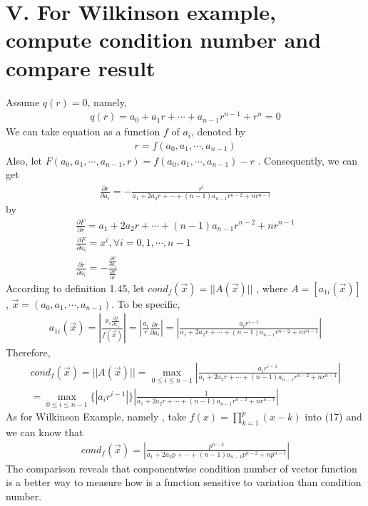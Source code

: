 \documentclass[twoside,a4paper]{article}
\begin{document}
\section*{V. For Wilkinson example, compute condition number and compare result}
Assume $q(r)=0$, namely,
\begin{gather}
q(r)=a_0+a_1r+\cdots+a_{n-1}r^{n-1}+r^n=0
\end{gather}
We can take equation as a function $f$ of $a_i$, denoted by
\begin{gather}
r=f(a_0,a_1,\cdots,a_{n-1})
\end{gather}
Also, let $F(a_0,a_1,\cdots,a_{n-1},r)=f(a_0,a_1,\cdots,a_{n-1})-r$ . Consequently, we can get
\begin{gather}
\frac{\partial r}{\partial a_i}=-\frac{r^i}{a_1+2a_2r+\cdots+(n-1)a_{n-1}r^{n-2}+nr^{n-1}}
\end{gather}
by
\begin{gather}
\frac{\partial{F}}{\partial{r}}=a_1+2a_2r+\cdots+(n-1)a_{n-1}r^{n-2}+nr^{n-1}\\
\frac{\partial{F}}{\partial{a_i}}=x^{i}, \forall i = 0,1,\cdots,n-1\\
\frac{\partial r}{\partial a_i}=-\frac{\frac{\partial{F}}{\partial{a_i}}}{\frac{\partial{F}}{\partial{r}}}
\end{gather}
According to definition 1.45, let $cond_f(\overrightarrow{x}) = ||A(\overrightarrow{x})||$ , where $A=[a_{1i}(\overrightarrow{x})]$ , $\overrightarrow{x}=(a_0,a_1,\cdots,a_{n-1})$. To be specific,
\begin{gather}
a_{1i}(\overrightarrow{x})=|\frac{x_i\frac{\partial f}{\partial x_i}}{f(\overrightarrow{x})}|=|\frac{a_i}{r}\frac{\partial r}{\partial a_i}|=|\frac{a_ir^{i-1}}{a_1+2a_2r+\cdots+(n-1)a_{n-1}r^{n-2}+nr^{n-1}}|
\end{gather}
Therefore,
\begin{gather}
cond_f(\overrightarrow{x})=||A(\overrightarrow{x})||=\max_{0 \leq i \leq {n-1}}|\frac{a_ir^{i-1}}{a_1+2a_2r+\cdots+(n-1)a_{n-1}r^{n-2}+nr^{n-1}}|\\
=\max_{0 \leq i \leq {n-1}} \{ |a_ir^{i-1}| \} |\frac{1}{a_1+2a_2r+\cdots+(n-1)a_{n-1}r^{n-2}+nr^{n-1}}|
\end{gather}
As for Wilkinson Example, namely , take $f(x)= \prod_{k=1}^{p}(x-k)$ into (17) and we can know that
\begin{gather}
cond_f(\overrightarrow{x})=|\frac{p^{n-2}}{a_1+2a_2p+\cdots+(n-1)a_{n-1}p^{n-2}+np^{n-1}}|
\end{gather}  
The comparison reveals that conponentwise condition number of vector function is a better way to measure how is a function sensitive to variation than condition number.
\end{document}
